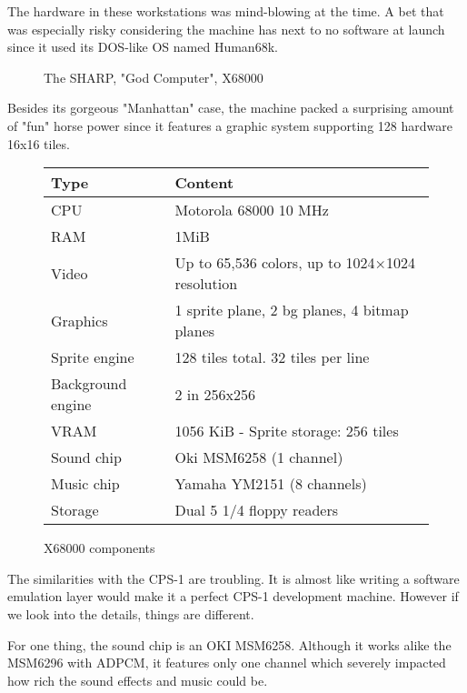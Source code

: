 The hardware in these workstations was mind-blowing at the time. A bet that was especially risky considering the machine has next to no software at launch since it used its DOS-like OS named Human68k.

\vfill

 \begin{figure}[H]
\caption*{The SHARP, "God Computer", X68000 }
\end{figure}


\pagebreak




Besides its gorgeous "Manhattan" case, the machine packed a surprising amount of "fun" horse power since it features a graphic system supporting 128 hardware 16x16 tiles.

 \begin{figure}[H]
\begin{tabularx}{\textwidth}{lX}
  \toprule    
  \textbf{Type } & \textbf{ Content } \\  
  \toprule   
    
CPU & Motorola 68000 10 MHz \\  
RAM & 1MiB \\ 
Video  & Up to 65,536 colors, up to 1024×1024 resolution \\
Graphics & 1 sprite plane, 2 bg planes, 4 bitmap planes\\
Sprite engine & 128 tiles total. 32 tiles per line\\
Background engine & 2 in 256x256 \\
VRAM & 1056 KiB - Sprite storage: 256 tiles\\
Sound chip & Oki MSM6258 (1 channel)  \\ 
Music chip & Yamaha YM2151 (8 channels)  \\ 
Storage & Dual 5 1/4 floppy readers  \\ 
  \toprule   
\end{tabularx}
\caption*{X68000 components}
\end{figure}

The similarities with the CPS-1 are troubling. It is almost like writing a software emulation layer would make it a perfect CPS-1 development machine. However if we look into the details, things are different.

For one thing, the sound chip is an OKI MSM6258. Although it works alike the MSM6296 with ADPCM, it features only one channel which severely impacted how rich the sound effects and music could be.

